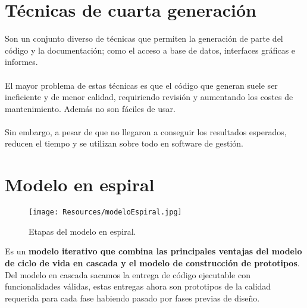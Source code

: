 \section{Técnicas de cuarta generación}
Son un conjunto diverso de técnicas que permiten la generación de parte del código y la documentación; como el acceso a base de datos, interfaces gráficas e informes.\\\\
El mayor problema de estas técnicas es que el código que generan suele ser ineficiente y de menor calidad, requiriendo revisión y aumentando los costes de mantenimiento. Además no son fáciles de usar.\\\\
Sin embargo, a pesar de que no llegaron a conseguir los resultados esperados, reducen el tiempo y se utilizan sobre todo en software de gestión.


\section{Modelo en espiral}

\begin{figure}[H]
   \centering
   \texttt{[image: Resources/modeloEspiral.jpg]}
   \caption{Etapas del modelo en espiral.}
   \label{fig:modeloEspiral}
\end{figure}

Es un \textbf{modelo iterativo que combina las principales ventajas del modelo de ciclo de vida en cascada y el modelo de construcción de prototipos}. Del modelo en cascada sacamos la entrega de código ejecutable con funcionalidades válidas, estas entregas ahora son prototipos de la calidad requerida para cada fase habiendo pasado por fases previas de diseño.\\

